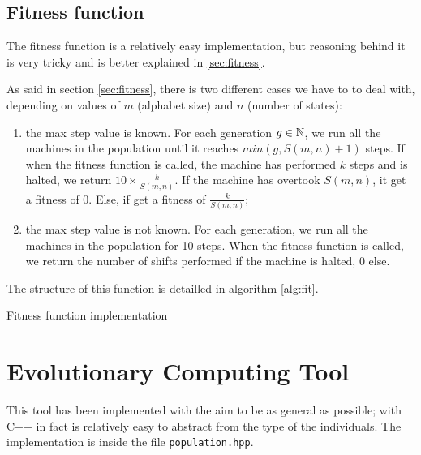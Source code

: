 \documentclass{report}
\begin{document}
\subsection{Fitness function}
\label{sec:fit}
The fitness function is a relatively easy implementation, but reasoning behind it is very tricky and is better explained in \ref{sec:fitness}.

As said in section \ref{sec:fitness}, there is two different cases we have to to deal with, depending on values of $m$ (alphabet size) and $n$ (number of states):
\begin{enumerate}
\item the max step value is known. For each generation $g\in \mathbb{N}$, we run all the machines in the population until it reaches $min(g, S(m,n) + 1)$ steps. If when the fitness function is called, the machine has performed $k$ steps and is halted, we return $10 \times \frac{k}{S(m,n)}$. If the machine has overtook $S(m,n)$, it get a fitness of 0. Else, if get a fitness of $\frac{k}{S(m,n)}$;
\item the max step value is not known. For each generation, we run all the machines in the population for 10 steps. When the fitness function is called, we return the number of shifts performed if the machine is halted, 0 else.
\end{enumerate}

The structure of this function is detailled in algorithm \ref{alg:fit}.

\begin{algorithm}[h]
\caption[Fitness function]{Fitness function implementation}
\label{alg:fit}

\end{algorithm}

\section{Evolutionary Computing Tool}
This tool has been implemented with the aim to be as general as possible; with C++ in fact is relatively easy to abstract from the type of the individuals. The implementation is inside the file \texttt{population.hpp}.
\end{document}
